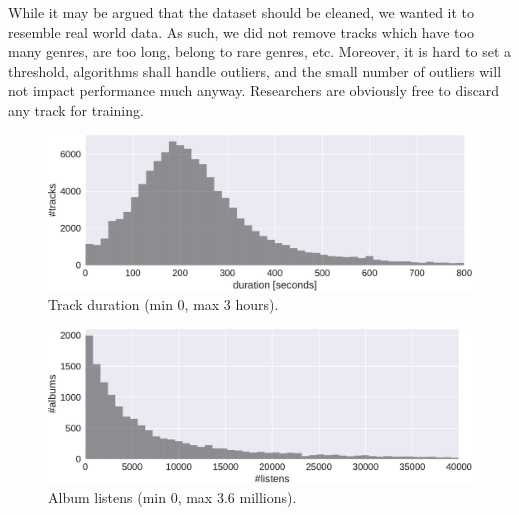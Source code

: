 \documentclass{article}
\begin{document}
While it may be argued that the dataset should be cleaned, we wanted it to resemble real world data. As such, we did not remove tracks which have too many genres, are too long, belong to rare genres, etc. Moreover, it is hard to set a threshold, algorithms shall handle outliers, and the small number of outliers will not impact performance much anyway. Researchers are obviously free to discard any track for training.


\begin{figure}
	\centering
	\includegraphics[width=\linewidth]{duration_distribution.pdf}
	\caption{Track duration (min 0, max 3 hours).}
	\label{fig:duration_distribution}
\end{figure}

\begin{figure}
	\centering
	\includegraphics[width=\linewidth]{listens_distribution.pdf}
	\caption{Album listens (min 0, max 3.6 millions).}
	\label{fig:listens_distribution}
\end{figure}
\end{document}
